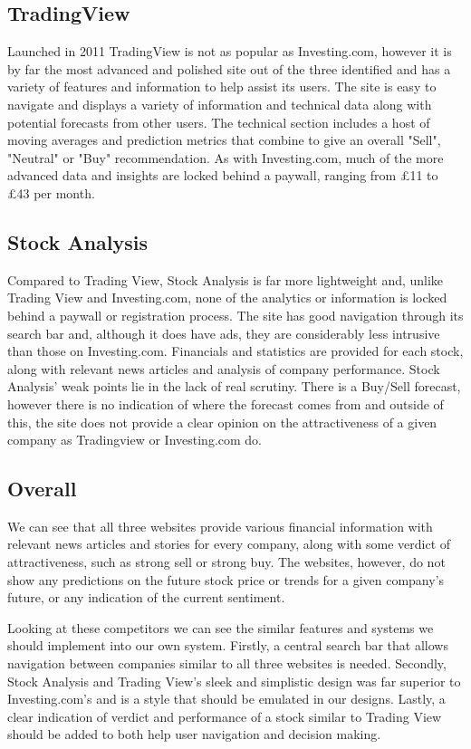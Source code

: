     \subsection{TradingView}
    Launched in 2011 TradingView is not as popular as Investing.com, however it is by far the most advanced and polished site out of the three identified and has a variety of features and information to help assist its users. The site is easy to navigate and displays a variety of information and technical data along with potential forecasts from other users. The technical section includes a host of moving averages and prediction metrics that combine to give an overall "Sell", "Neutral" or "Buy" recommendation. As with Investing.com, much of the more advanced data and insights are locked behind a paywall, ranging from £11 to £43 per month. 
        
    \subsection{Stock Analysis}
    Compared to Trading View, Stock Analysis is far more lightweight and, unlike Trading View and Investing.com, none of the analytics or information is locked behind a paywall or registration process. The site has good navigation through its search bar and, although it does have ads, they are considerably less intrusive than those on Investing.com. Financials and statistics are provided for each stock, along with relevant news articles and analysis of company performance. Stock Analysis’ weak points lie in the lack of real scrutiny. There is a Buy/Sell forecast, however there is no indication of where the forecast comes from and outside of this, the site does not provide a clear opinion on the attractiveness of a given company as Tradingview or Investing.com do.
    
    \subsection{Overall}   
	We can see that all three websites provide various financial information with relevant news articles and stories for every company, along with some verdict of attractiveness, such as strong sell or strong buy. The websites, however, do not show any predictions on the future stock price or trends for a given company’s future, or any indication of the current sentiment. 
	
    Looking at these competitors we can see the similar features and systems we should implement into our own system. Firstly, a central search bar that allows navigation between companies similar to all three websites is needed. Secondly, Stock Analysis and Trading View's sleek and simplistic design was far superior to Investing.com’s and is a style that should be emulated in our designs. Lastly, a clear indication of verdict and performance of a stock similar to Trading View should be added to both help user navigation and decision making.
	

